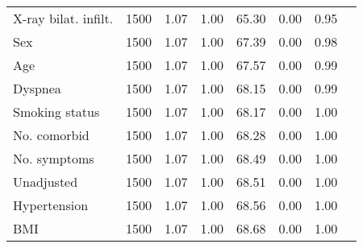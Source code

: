 \documentclass{article}
\begin{document}
{\begin{longtable}{lccccccc}
X-ray bilat. infilt. & 1500 & 1.07 & 1.00 & 65.30 &  0.00 & 0.95 \\ 
Sex & 1500 & 1.07 & 1.00 & 67.39 &  0.00 & 0.98 \\ 
Age & 1500 & 1.07 & 1.00 & 67.57 &  0.00 & 0.99 \\ 
Dyspnea & 1500 & 1.07 & 1.00 & 68.15 &  0.00 & 0.99 \\ 
Smoking status & 1500 & 1.07 & 1.00 & 68.17 &  0.00 & 1.00 \\ 
No. comorbid & 1500 & 1.07 & 1.00 & 68.28 &  0.00 & 1.00 \\ 
No. symptoms & 1500 & 1.07 & 1.00 & 68.49 &  0.00 & 1.00 \\ 
Unadjusted & 1500 & 1.07 & 1.00 & 68.51 &  0.00 & 1.00 \\ 
Hypertension & 1500 & 1.07 & 1.00 & 68.56 &  0.00 & 1.00 \\ 
BMI & 1500 & 1.07 & 1.00 & 68.68 &  0.00 & 1.00 \\
\bottomrule
\hline
\end{longtable}
}

\clearpage
\end{document}
